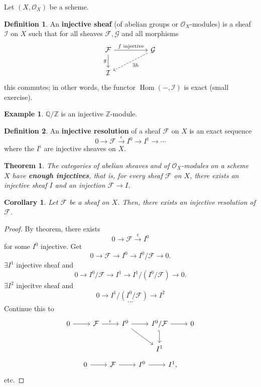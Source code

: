 \documentclass[12pt]{article}
\DeclareMathOperator{\Hom}{Hom}
\newtheorem*{theorem}{Theorem}
\newtheorem*{corollary}{Corollary}
\theoremstyle{definition}
\newtheorem*{definition}{Definition}
\newtheorem*{example}{Example}
\theoremstyle{remark}
\begin{document}
Let $(X,\mathcal{O}_X)$ be a scheme.

\begin{definition}
An \textbf{injective sheaf} (of abelian groups or $\mathcal{O}_X$-modules) is a sheaf $\mathcal{I}$ on $X$ such that for all sheaves $\mathcal{F},\mathcal{G}$ and all morphisms
\[
\begin{tikzcd}
\mathcal{F}\arrow[rr,"f\text{ injective}"]\arrow[d,"g",swap]&&\mathcal{G}\arrow[lld,dashed,"\exists h"]\\
\mathcal{I}
\end{tikzcd}
\]
this commutes; in other words, the functor $\Hom(-,\mathcal{I})$ is exact (small exercise).
\end{definition}

\begin{example}
$\mathbb{Q}/\mathbb{Z}$ is an injective $\mathbb{Z}$-module.
\end{example}

\begin{definition}
An \textbf{injective resolution} of a sheaf $\mathcal{F}$ on $X$ is an exact sequence
\[0\longrightarrow\mathcal{F}\overset{\epsilon}{\longrightarrow}I^0\longrightarrow I^1\longrightarrow\cdots\]
where the $I^i$ are injective sheaves on $X$.
\end{definition}

\begin{theorem}
The categories of abelian sheaves and of $\mathcal{O}_X$-modules on a scheme $X$ have \textbf{enough injectives}, that is, for every sheaf $\mathcal{F}$ on $X$, there exists an injective sheaf $I$ and an injection $\mathcal{F}\rightarrow I$.
\end{theorem}

\begin{corollary}
Let $\mathcal{F}$ be a sheaf on $X$. Then, there exists an injective resolution of $\mathcal{F}$.
\end{corollary}

\begin{proof}
By theorem, there exists
\[0\longrightarrow\mathcal{F}\overset{\epsilon}{\longrightarrow}I^0\]
for some $I^0$ injective. Get
\[0\longrightarrow\mathcal{F}\longrightarrow I^0\longrightarrow I^0/\mathcal{F}\longrightarrow0.\]
$\exists I^1$ injective sheaf and
\[0\longrightarrow I^0/\mathcal{F}\longrightarrow I^1\longrightarrow I^1/(I^0/\mathcal{F})\longrightarrow0.\]
$\exists I^2$ injecitve sheaf and
\[0\longrightarrow I^1/(I^0/\mathcal{F})\longrightarrow I^2\]
\[\cdots\]
Continue this to
\[
\begin{tikzcd}
0\arrow[r]&\mathcal{F}\arrow[r,"\epsilon"]&I^0\arrow[r]\arrow[rd]&I^0/\mathcal{F}\arrow[r]\arrow[d,hook']&0\\
&&&I^1
\end{tikzcd}
\]
\[
\begin{tikzcd}
0\arrow[r]&\mathcal{F}\arrow[r]&I^0\arrow[r]&I^1,
\end{tikzcd}
\]
etc.
\end{proof}
\end{document}
